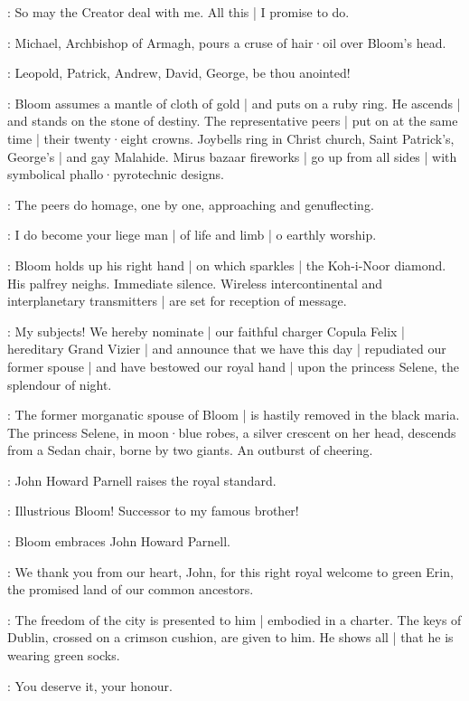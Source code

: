 \Bloom:
So may the Creator deal with me.
All this |
I promise to do.

:
Michael,
Archbishop of Armagh,
pours a cruse of hair·oil over Bloom's head.

\MikeArmagh:
Leopold,
Patrick,
Andrew,
David,
George,
be thou anointed!

:
Bloom assumes a mantle of cloth of gold |
and puts on a ruby ring.
He ascends |
and stands on the stone of destiny.
The representative peers |
put on at the same time |
their twenty·eight crowns.
Joybells ring in Christ church,
Saint Patrick's,
George's |
and gay Malahide.
Mirus bazaar fireworks |
go up from all sides |
with symbolical phallo·pyrotechnic designs.

:
The peers do homage,
one by one,
approaching and genuflecting.

\Peers:
I do become your liege man |
of life and limb  |
o earthly worship.

:
Bloom holds up his right hand |
on which sparkles |
the Koh-i-Noor diamond.
His palfrey neighs.
Immediate silence.
Wireless intercontinental and interplanetary transmitters |
are set for reception of message.

\Bloom:
My subjects!
We hereby nominate |
our faithful charger Copula Felix |
hereditary Grand Vizier |
and announce that we have this day |
repudiated our former spouse |
and have bestowed our royal hand |
upon the princess Selene,
the splendour of night.

:
The former morganatic spouse of Bloom |
is hastily removed in the black maria.
The princess Selene,
in moon·blue robes,
a silver crescent on her head,
descends from a Sedan chair,
borne by two giants.
An outburst of cheering.

:
John Howard Parnell raises the royal standard.

\Parnell:
Illustrious Bloom!
Successor to my famous brother!

:
Bloom embraces John Howard Parnell.

\Bloom:
We thank you from our heart,
John,
for this right royal welcome to green Erin,
the promised land of our common ancestors.

:
The freedom of the city is presented to him |
embodied in a charter.
The keys of Dublin,
crossed on a crimson cushion,
are given to him.%
He shows all |
that he is wearing green socks.

\Kernan[2]:
You deserve it,
your honour.

